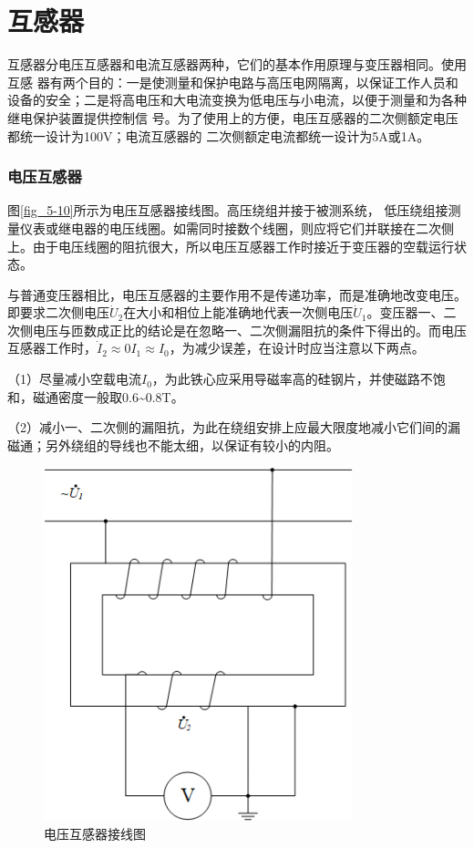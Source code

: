 \documentclass{book}
\begin{document}
\section{互感器}

互感器分电压互感器和电流互感器两种，它们的基本作用原理与变压器相同。使用互感 器有两个目的：一是使测量和保护电路与高压电网隔离，以保证工作人员和设备的安全；二是将高电压和大电流变换为低电压与小电流，以便于测量和为各种继电保护装置提供控制信 号。为了使用上的方便，电压互感器的二次侧额定电压都统一设计为100V；电流互感器的 二次侧额定电流都统一设计为5A或1A。
\subsubsection{电压互感器}

图\ref{fig_5-10}所示为电压互感器接线图。高压绕组并接于被测系统， 低压绕组接测量仪表或继电器的电压线圈。如需同时接数个线圈，则应将它们并联接在二次侧上。由于电压线圈的阻抗很大，所以电压互感器工作时接近于变压器的空载运行状态。

与普通变压器相比，电压互感器的主要作用不是传递功率，而是准确地改变电压。即要求二次侧电压${{\dot{U}}_{2}}$在大小和相位上能准确地代表一次侧电压${{\dot{U}}_{1}}$。变压器一、二次侧电压与匝数成正比的结论是在忽略一、二次侧漏阻抗的条件下得出的。而电压互感器工作时，${{\dot{I}}_{2}}\approx 0{{I}_{1}}\approx {{I}_{0}}$，为减少误差，在设计时应当注意以下两点。 

（1）尽量减小空载电流${{I}_{0}}$，为此铁心应采用导磁率高的硅钢片，并使磁路不饱和，磁通密度一般取0.6\textasciitilde0.8T。

（2）减小一、二次侧的漏阻抗，为此在绕组安排上应最大限度地减小它们间的漏磁通；另外绕组的导线也不能太细，以保证有较小的内阻。

\begin{figure}[H]
	\centering
	\includegraphics[width=0.80\textwidth]{5-11G.png}
	\caption{电压互感器接线图}
	\label{fig_5-11}
\end{figure}
\end{document}
